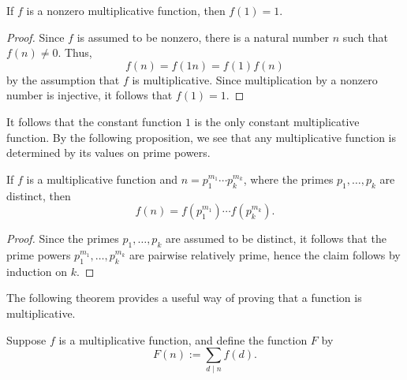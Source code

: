 \begin{proposition}
  If $f$ is a nonzero multiplicative function, then $f(1)=1$.
\end{proposition}

\begin{proof}
  Since $f$ is assumed to be nonzero, there is a natural number $n$ such that $f(n)\neq 0$. Thus,
  \begin{equation*}
    f(n)=f(1n)=f(1)f(n)
  \end{equation*}
  by the assumption that $f$ is multiplicative. Since multiplication by a nonzero number is injective, it follows that $f(1)=1$.
\end{proof}

It follows that the constant function $1$ is the only constant multiplicative function.
By the following proposition, we see that any multiplicative function is determined by its values on prime powers.

\begin{proposition}
  If $f$ is a multiplicative function and $n=p_1^{m_1}\cdots p_k^{m_k}$, where the primes $p_1,\ldots,p_k$ are distinct, then
  \begin{equation*}
    f(n)=f(p_1^{m_1})\cdots f(p_k^{m_k}).
  \end{equation*}
\end{proposition}

\begin{proof}
  Since the primes $p_1,\ldots,p_k$ are assumed to be distinct, it follows that the prime powers $p_1^{m_1},\ldots,p_k^{m_k}$ are pairwise relatively prime, hence the claim follows by induction on $k$.
\end{proof}

The following theorem provides a useful way of proving that a function is multiplicative.

\begin{theorem}\label{theorem:multiplicative-functions}
  Suppose $f$ is a multiplicative function, and define the function $F$ by
  \begin{equation*}
    F(n):=\sum_{d\mid n}f(d).
  \end{equation*}
\end{theorem}


